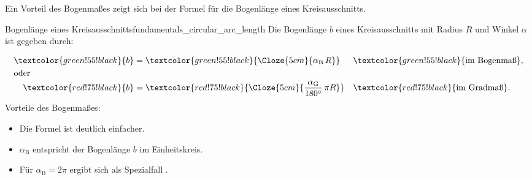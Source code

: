 Ein Vorteil des Bogenmaßes zeigt sich bei der Formel für die Bogenlänge eines
Kreisausschnitts.
\begin{KeyPointBox}{Bogenlänge eines Kreisausschnitts}{fundamentals_circular_arc_length}
  Die Bogenlänge $b$ eines Kreisausschnitts mit Radius $R$ und Winkel $\alpha$
  ist gegeben durch:
  \noindent
  \begin{minipage}[c]{0.59\linewidth}
    \begin{align*}
      \textcolor{green!55!black}{b}
        &= \textcolor{green!55!black}{\Cloze{5cm}{\alpha_{\mathrm B}\,R}}
        && \textcolor{green!55!black}{\text{im Bogenmaß}}, \\[-0.2em]
      \shortintertext{oder}
      \textcolor{red!75!black}{b}
        &= \textcolor{red!75!black}{
             \Cloze{5cm}{\frac{\alpha_{\mathrm G}}{180^\circ}\,\pi R}}
        && \textcolor{red!75!black}{\text{im Gradmaß}}.
    \end{align*}
    Vorteile des Bogenmaßes:
    \begin{itemize}
      \item Die Formel ist deutlich einfacher.
      \item $\alpha_{\mathrm B}$ entspricht der Bogenlänge $b$ im Einheitskreis.
      \item Für $\alpha_{\mathrm B}=2\pi$ ergibt sich als Spezialfall
        .
    \end{itemize}
  \end{minipage}\hfill
  \begin{minipage}[c]{0.36\linewidth}
    \centering
    
  \end{minipage}
\end{KeyPointBox}
